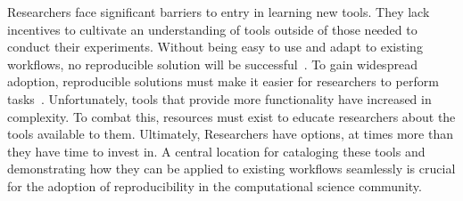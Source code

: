\documentclass{IEEEtran}
\begin{document}
Researchers face significant barriers to entry in learning new tools. They lack incentives to cultivate an understanding of tools outside of those needed to conduct their experiments. Without being easy to use and adapt to existing workflows, no reproducible solution will be successful~\cite{ITD}. To gain widespread adoption, reproducible solutions must make it easier for researchers to perform tasks~\cite{ITD}. Unfortunately, tools that provide more functionality have increased in complexity. To combat this, resources must exist to educate researchers about the tools available to them. Ultimately, Researchers have options, at times more than they have time to invest in. A central location for cataloging these tools and demonstrating how they can be applied to existing workflows seamlessly is crucial for the adoption of reproducibility in the computational science community.


\end{document}
